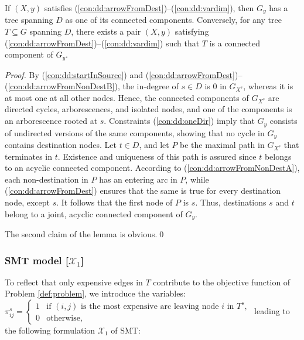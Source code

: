 \begin{lemma} \label{lem:x0valid}
If $(X,y)$ satisfies (\ref{con:dd:arrowFromDest})--(\ref{con:dd:vardim}), then $G_y$ has a tree spanning $D$ as one of its connected components.
Conversely, for any tree $T\subseteq G$ spanning $D$, there exists a pair $(X,y)$ satisfying (\ref{con:dd:arrowFromDest})--(\ref{con:dd:vardim}) such that $T$
is a connected component of $G_y$.
\end{lemma}
\begin{proof}
By (\ref{con:dd:startInSource}) and (\ref{con:dd:arrowFromDest})--(\ref{con:dd:arrowFromNonDestB}),
the in-degree of $s\in D$ is 0 in $G_{X^s}$, whereas it is at most one at all other nodes.
Hence, the connected components of $G_{X^s}$ are directed cycles, arborescences, and isolated nodes,
and one of the components is an arborescence rooted at $s$.
Constraints (\ref{con:dd:oneDir}) imply that $G_y$ consists of undirected versions of the same components,
showing that no cycle in $G_y$ contains destination nodes.
Let $t\in D$, and let $P$
be the maximal path in $G_{X^s}$ that terminates in $t$.
Existence and uniqueness of this path is assured since $t$ belongs to an acyclic connected component.
According to (\ref{con:dd:arrowFromNonDestA}), each non-destination in $P$ has an entering arc in $P$,
while (\ref{con:dd:arrowFromDest}) ensures that the same is true for every destination node, except $s$.
It follows that the first node of $P$ is $s$.
Thus, destinations $s$ and $t$ belong to a joint, acyclic connected component of $G_y$.

The second claim of the lemma is obvious.\qed
\end{proof}


\subsubsection{SMT model [$\mathcal{X}_1$]} \label{sec:x1}

To reflect that only expensive edges in $T$ contribute to the objective function of Problem \ref{def:problem}, we introduce the variables:
\newline\newline
$\pi^s_{ij}=
\begin{cases}
    1 & \text{if $(i,j)$ is the most expensive arc leaving node $i$ in $T^s$},\\
    0 & \text{otherwise},
  \end{cases}$
\newline\newline
leading to the following formulation $\mathcal{X}_1$ of SMT:

